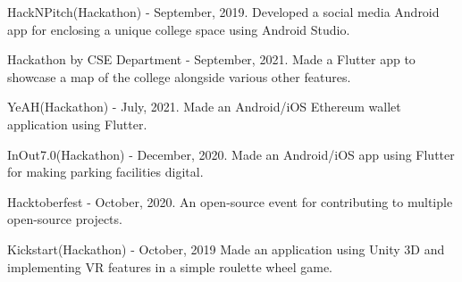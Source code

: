 \begin{zitemize}

\setlength\itemsep{0.5em}

\item HackNPitch(Hackathon) - September, 2019. Developed a social media Android app for enclosing a unique college space using Android Studio.

\item Hackathon by CSE Department - September, 2021. Made a Flutter app to showcase a map of the college alongside various other features.

\item YeAH(Hackathon) - July, 2021. Made an Android/iOS Ethereum wallet application using Flutter.

\item InOut7.0(Hackathon) - December, 2020. Made an Android/iOS app using Flutter for making parking facilities digital.

\item Hacktoberfest - October, 2020. An open-source event for contributing to multiple open-source projects.

\item Kickstart(Hackathon) - October, 2019 Made an application using Unity 3D and implementing VR features in a simple roulette wheel game.

\end{zitemize}